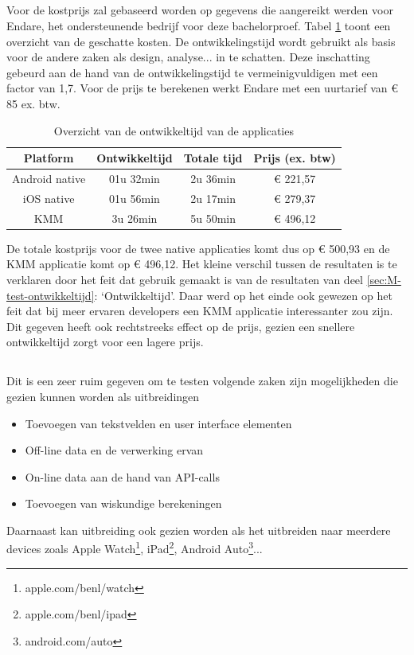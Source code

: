 \subsection{}
\label{sec:M-test-lijnen-kostprijs}
Voor de kostprijs zal gebaseerd worden op gegevens die aangereikt werden voor Endare, het ondersteunende bedrijf voor deze bachelorproef. Tabel \ref{T:prijzen-overzicht} toont een overzicht van de geschatte kosten. De ontwikkelingstijd wordt gebruikt als basis voor de andere zaken als design, analyse... in te schatten. Deze inschatting gebeurd aan de hand van de ontwikkelingstijd te vermeinigvuldigen met een factor van 1,7. Voor de prijs te berekenen werkt Endare met een uurtarief van \euro{} 85 ex. btw.

\begin{table}[H]
    \centering
    \caption{Overzicht van de ontwikkeltijd van de applicaties}
    \begin{tabular}{|c|c|c|c|}
        \hline
        {\textbf{Platform}} & {\textbf{Ontwikkeltijd}}& {\textbf{Totale tijd}}& {\textbf{Prijs (ex. btw)}}\\ \hline \hline
        Android native&01u 32min&2u 36min&\euro{} 221,57\\ \hline
        iOS native&01u 56min&2u 17min&\euro{} 279,37\\ \hline
        KMM&3u 26min&5u 50min&\euro{} 496,12\\ \hline
    \end{tabular}
    \label{T:prijzen-overzicht}
\end{table}

De totale kostprijs voor de twee native applicaties komt dus op \euro{} 500,93 en de KMM applicatie komt op \euro{} 496,12. Het kleine verschil tussen de resultaten is te verklaren door het feit dat gebruik gemaakt is van de resultaten van deel \ref{sec:M-test-ontwikkeltijd}: `Ontwikkeltijd'. Daar werd op het einde ook gewezen op het feit dat bij meer ervaren developers een KMM applicatie interessanter zou zijn. Dit gegeven heeft ook rechtstreeks effect op de prijs, gezien een snellere ontwikkeltijd zorgt voor een lagere prijs.

\subsection{}
\label{sec:M-test-lijnen-uitbreiding}

Dit is een zeer ruim gegeven om te testen volgende zaken zijn mogelijkheden die gezien kunnen worden als uitbreidingen
\begin{itemize}
    \item Toevoegen van tekstvelden en user interface elementen
    \item Off-line data en de verwerking ervan
    \item On-line data aan de hand van API-calls
    \item Toevoegen van wiskundige berekeningen
\end{itemize}

Daarnaast kan uitbreiding ook gezien worden als het uitbreiden naar meerdere devices zoals Apple Watch\footnote{apple.com/benl/watch}, iPad\footnote{apple.com/benl/ipad}, Android Auto\footnote{android.com/auto}...




